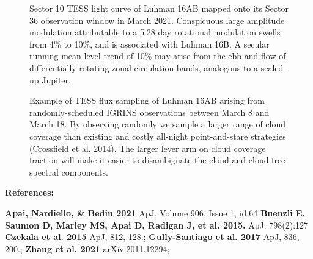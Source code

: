 \documentclass[11pt]{article}
\begin{document}
{\begin{figure}[h!]
    \caption{Sector 10 TESS light curve of Luhman 16AB mapped onto its Sector 36 observation window in March 2021.  Conspicuous large amplitude modulation attributable to a 5.28 day rotational modulation swells from 4\% to 10\%, and is associated with Luhman 16B.  A secular running-mean level trend of 10\% may arise from the ebb-and-flow of differentially rotating zonal circulation bands, analogous to a scaled-up Jupiter.}
\end{figure}

\begin{figure}[h!]
    \caption{Example of TESS flux sampling of Luhman 16AB arising from randomly-scheduled IGRINS observations between March 8 and March 18.  By observing randomly we sample a larger range of cloud coverage than existing and costly all-night point-and-stare strategies (Crossfield et al. 2014).  The larger lever arm on cloud coverage fraction will make it easier to disambiguate the cloud and cloud-free spectral components.}
\end{figure}
    

\setlength{\parindent}{0cm}
\textbf{References:}
{\footnotesize \textbf{Apai, Nardiello, \& Bedin 2021} ApJ, Volume 906, Issue 1, id.64 \textbf{Buenzli E, Saumon D, Marley MS, Apai D, Radigan J, et al. 2015.} ApJ. 798(2):127 \textbf{Czekala et al. 2015} ApJ, 812, 128.; \textbf{Gully-Santiago et al. 2017} ApJ, 836, 200.; \textbf{Zhang et al. 2021} arXiv:2011.12294;
\setlength{\parindent}{1cm}

\clearpage


%
%
%

}}
\end{document}
